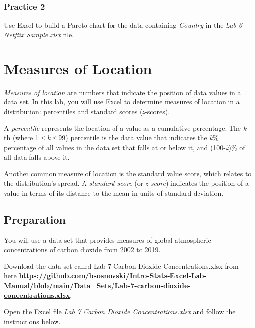 \documentclass[
]{book}
\begin{document}
\hypertarget{practice-2-4}{%
\subsection{Practice 2}\label{practice-2-4}}

Use Excel to build a Pareto chart for the data containing \emph{Country} in the \emph{Lab 6 Netflix Sample.xlsx} file.

\hypertarget{measures-of-location}{%
\chapter{Measures of Location}\label{measures-of-location}}

\emph{Measures of location} are numbers that indicate the position of data values in a data set. In this lab, you will use Excel to determine measures of location in a distribution: percentiles and standard scores (\emph{z}-scores).

A \emph{percentile} represents the location of a value as a cumulative percentage. The \emph{k}-th (where 1 ≤ \emph{k} ≤ 99) percentile is the data value that indicates the \emph{k}\% percentage of all values in the data set that falls at or below it, and (100-\emph{k})\% of all data falls above it.

Another common measure of location is the standard value score, which relates to the distribution's spread. A \emph{standard score} (or \emph{z-score}) indicates the position of a value in terms of its distance to the mean in units of standard deviation.

\hypertarget{preparation-4}{%
\section{Preparation}\label{preparation-4}}

You will use a data set that provides measures of global atmospheric concentrations of carbon dioxide from 2002 to 2019.

Download the data set called Lab 7 Carbon Dioxide Concentrations.xlsx from here \href{https://github.com/bsosnovski/Intro-Stats-Excel-Lab-Manual/blob/main/Data_Sets/Lab-7-carbon-dioxide-concentrations.xlsx}{\textbf{https://github.com/bsosnovski/Intro-Stats-Excel-Lab-Manual/blob/main/Data\_Sets/Lab-7-carbon-dioxide-concentrations.xlsx}}.

Open the Excel file \emph{Lab 7 Carbon Dioxide Concentrations.xlsx} and follow the instructions below.
\end{document}
